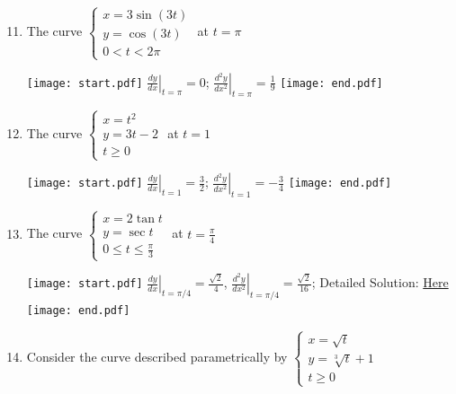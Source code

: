 \documentclass[12pt]{article}
\begin{document}

\begin{enumerate}
\setcounter{enumi}{10}

\item The curve $\left\{\begin{array}{l}
x=3\sin{(3t)}\\
y=\cos{(3t)}\\
0<t<2\pi\end{array}\right.$ at $t=\pi$ 

\texttt{[image: start.pdf]}
{{$\left.\frac{dy}{dx}\right|_{t=\pi}=0$; $\left.\frac{d^2y}{dx^2}\right|_{t=\pi}=\frac{1}{9}$}}
\texttt{[image: end.pdf]}


\item The curve $\left\{\begin{array}{l}
x=t^2\\
y=3t-2\\
t \geq 0 \end{array}\right.$ at $t=1$ 

\texttt{[image: start.pdf]}
{{$\left.\frac{dy}{dx}\right|_{t=1}=\frac{3}{2}$; $\left.\frac{d^2y}{dx^2}\right|_{t=1}=-\frac{3}{4}$}}
\texttt{[image: end.pdf]}


\item The curve $\left\{\begin{array}{l}
x=2\tan{t}\\
y=\sec{t}\\
0 \leq t \leq \frac{\pi}{3} \end{array}\right.$ at $t=\frac{\pi}{4}$ 

\texttt{[image: start.pdf]}
{{$\left.\frac{dy}{dx}\right|_{t=\pi/4}=\frac{\sqrt{2}}{4}$, $\left.\frac{d^2y}{dx^2}\right|_{t=\pi/4}=\frac{\sqrt{2}}{16}$; Detailed Solution: \textcolor{blue}{\href{http://www.math.drexel.edu/classes/Calculus/resources/Math122HW/Solutions/122_17_Parametric_13.pdf}{Here}}}}
\texttt{[image: end.pdf]}


\item Consider the curve described parametrically by $\left\{\begin{array}{l}
x=\sqrt{t}\\
y=\sqrt[3]{t}+1\\
t \geq 0 \end{array}\right.$

\begin{enumerate}


\end{enumerate}
\end{enumerate}
\end{document}
